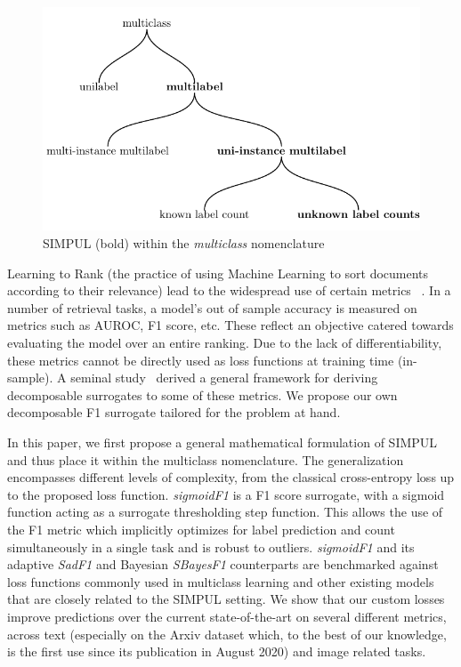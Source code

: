 \begin{figure}[t]
\centering
\includegraphics[width=.9\linewidth]{./tree/Tree.pdf}
\caption{\label{fig:tree}
SIMPUL (bold) within the \emph{multiclass} nomenclature
}
\end{figure}

Learning to Rank (the practice of using Machine Learning to sort documents according to their relevance) lead to the widespread use of certain metrics~\cite{LTR} . In a number of retrieval tasks, a model's out of sample accuracy is measured on metrics such as AUROC, F1 score, etc. These reflect an objective catered towards evaluating the model over an entire ranking. Due to the lack of differentiability, these metrics cannot be directly used as loss functions at training time (in-sample). A seminal study~\cite{optimizableLosses} derived a general framework for deriving decomposable surrogates to some of these metrics. We propose our own decomposable F1 surrogate tailored for the problem at hand.

In this paper, we first propose a general mathematical formulation of SIMPUL and thus place it within the multiclass nomenclature.  The generalization encompasses different levels of complexity, from the classical cross-entropy loss up to the proposed loss function. \emph{sigmoidF1} is a F1 score surrogate, with a sigmoid function acting as a surrogate thresholding step function. This allows the use of the F1 metric which implicitly optimizes for label prediction and count simultaneously in a single task and is robust to outliers.  \emph{sigmoidF1} and its adaptive \emph{SadF1} and Bayesian \emph{SBayesF1} counterparts are benchmarked against loss functions commonly used in multiclass learning and other existing models that are closely related to the SIMPUL setting. We show that our custom losses improve predictions over the current  state-of-the-art on several different metrics, across text (especially on the Arxiv dataset which, to the best of our knowledge, is the first use since its publication in August 2020) and image related tasks.

